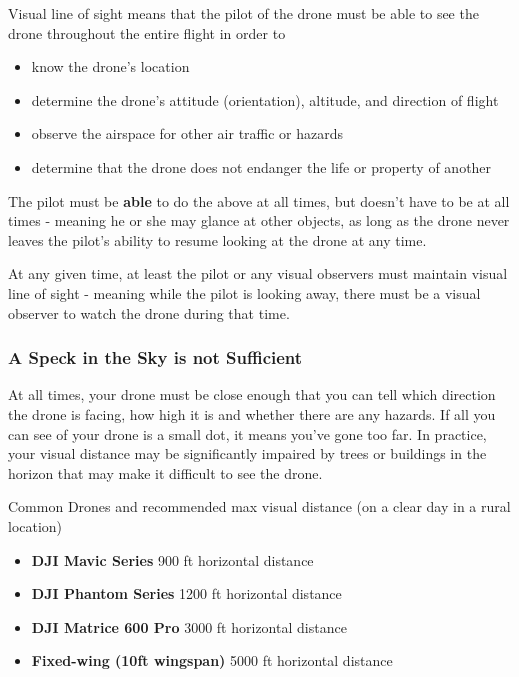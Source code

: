 \documentclass[
  12pt,
]{book}
\providecommand{\tightlist}{%
  \setlength{\itemsep}{0pt}\setlength{\parskip}{0pt}}
\begin{document}
Visual line of sight means that the pilot of the drone must be able to see the drone throughout the entire flight in order to

\begin{itemize}
\tightlist
\item
  know the drone's location
\item
  determine the drone's attitude (orientation), altitude, and direction of flight
\item
  observe the airspace for other air traffic or hazards
\item
  determine that the drone does not endanger the life or property of another
\end{itemize}

The pilot must be \textbf{able} to do the above at all times, but doesn't have to be at all times - meaning he or she may glance at other objects, as long as the drone never leaves the pilot's ability to resume looking at the drone at any time.

At any given time, at least the pilot or any visual observers must maintain visual line of sight - meaning while the pilot is looking away, there must be a visual observer to watch the drone during that time.

\subsubsection{A Speck in the Sky is not Sufficient}\label{a-speck-in-the-sky-is-not-sufficient}

At all times, your drone must be close enough that you can tell which direction the drone is facing, how high it is and whether there are any hazards. If all you can see of your drone is a small dot, it means you've gone too far. In practice, your visual distance may be significantly impaired by trees or buildings in the horizon that may make it difficult to see the drone.

Common Drones and recommended max visual distance (on a clear day in a rural location)

\begin{itemize}
\tightlist
\item
  \textbf{DJI Mavic Series} 900 ft horizontal distance
\item
  \textbf{DJI Phantom Series} 1200 ft horizontal distance
\item
  \textbf{DJI Matrice 600 Pro} 3000 ft horizontal distance
\item
  \textbf{Fixed-wing (10ft wingspan)} 5000 ft horizontal distance
\end{itemize}
\end{document}
